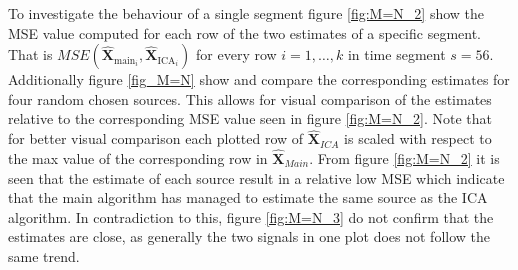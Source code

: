 \noindent
To investigate the behaviour of a single segment figure \ref{fig:M=N_2} show the MSE value computed for each row of the two estimates of a specific segment. That is $MSE\left(\hat{\mathbf{X}}_{\text{main}_{i}},\hat{\mathbf{X}}_{\text{ICA}_{i}}\right)$ for every row $i = 1, \hdots, k$ in time segment $s=56$. Additionally figure \ref{fig_M=N} show and compare the corresponding estimates for four random chosen sources. This allows for visual comparison of the estimates relative to the corresponding MSE value seen in figure \ref{fig:M=N_2}. Note that for better visual comparison each plotted row of $\hat{\textbf{X}}_{ICA}$ is scaled with respect to the max value of the corresponding row in $\hat{\textbf{X}}_{Main}$.
From figure \ref{fig:M=N_2} it is seen that the estimate of each source result in a relative low MSE which indicate that the main algorithm has managed to estimate the same source as the ICA algorithm. In contradiction to this, figure \ref{fig:M=N_3} do not confirm that the estimates are close, as generally the two signals in one plot does not follow the same trend.   
